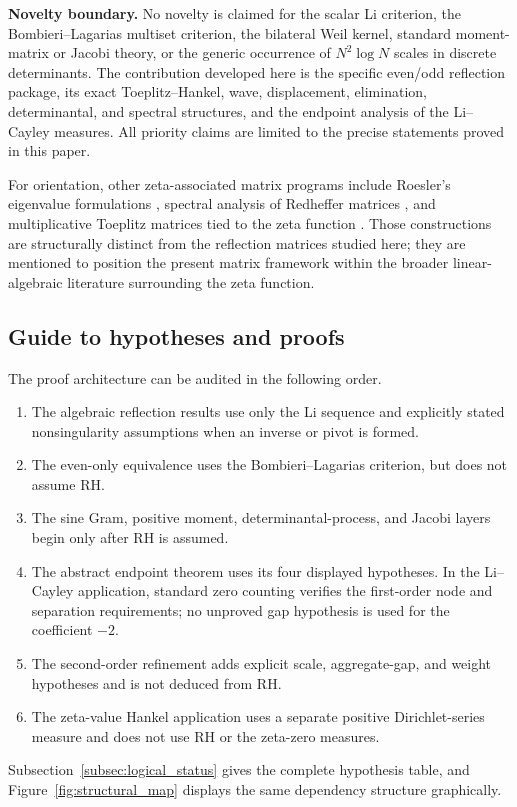 \documentclass[preprint,12pt]{elsarticle}
\numberwithin{equation}{section}
\theoremstyle{plain}
\theoremstyle{definition}
\theoremstyle{remark}
\newcommand{\RH}{\mathrm{RH}}
\begin{document}
\medskip
\noindent\textbf{Novelty boundary.}
No novelty is claimed for the scalar Li criterion, the Bombieri--Lagarias multiset criterion,
the bilateral Weil kernel, standard moment-matrix or Jacobi theory, or the generic occurrence of
\(N^2\log N\) scales in discrete determinants.  The contribution developed here is the specific
even/odd reflection package, its exact Toeplitz--Hankel, wave, displacement, elimination,
determinantal, and spectral structures, and the endpoint analysis of the Li--Cayley measures.
All priority claims are limited to the precise statements proved in this paper.

For orientation, other zeta-associated matrix programs include Roesler's eigenvalue
formulations \cite{Roesler1986,Roesler1987}, spectral analysis of Redheffer matrices
\cite{Vaughan1996}, and multiplicative Toeplitz matrices tied to the zeta function
\cite{Hilberdink2006,Hilberdink2015}. Those constructions are structurally distinct from
the reflection matrices studied here; they are mentioned to position the present matrix
framework within the broader linear-algebraic literature surrounding the zeta function.

\subsection{Guide to hypotheses and proofs}
\label{subsec:proof_audit_guide}
The proof architecture can be audited in the following order.
\begin{enumerate}[label=\textup{(\alph*)},leftmargin=2.5em]
\item The algebraic reflection results use only the Li sequence and explicitly stated
nonsingularity assumptions when an inverse or pivot is formed.
\item The even-only equivalence uses the Bombieri--Lagarias criterion, but does not assume
\(\RH\).
\item The sine Gram, positive moment, determinantal-process, and Jacobi layers begin only after
\(\RH\) is assumed.
\item The abstract endpoint theorem uses its four displayed hypotheses.  In the Li--Cayley
application, standard zero counting verifies the first-order node and separation requirements;
no unproved gap hypothesis is used for the coefficient \(-2\).
\item The second-order refinement adds explicit scale, aggregate-gap, and weight hypotheses and
is not deduced from \(\RH\).
\item The zeta-value Hankel application uses a separate positive Dirichlet-series measure and
does not use \(\RH\) or the zeta-zero measures.
\end{enumerate}
Subsection~\ref{subsec:logical_status} gives the complete hypothesis table, and
Figure~\ref{fig:structural_map} displays the same dependency structure graphically.
\end{document}
